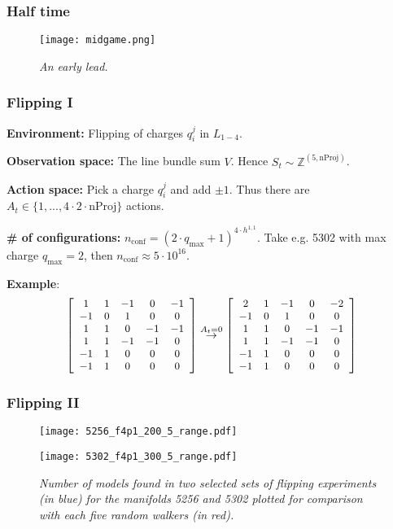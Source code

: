 \documentclass{beamer}
\begin{document}
\begin{frame}
\frametitle{Half time}
\begin{figure}
	\centering
	\texttt{[image: midgame.png]}
	\caption{\it An early lead.}
\end{figure}
\end{frame}

\begin{frame}
\frametitle{Flipping I}
\textbf{Environment:} Flipping of charges $q_i^j$ in $L_{1-4}$.

\textbf{Observation space:} The line bundle sum $V$. Hence $S_t \sim \mathbb{Z}^{(5 , \text{nProj})}$.

\textbf{Action space:} Pick a charge $q_i^j$ and add $\pm 1$. Thus there are $A_t \in \{1, ..., 4 \cdot 2 \cdot \text{nProj} \}$ actions.

\textbf{\# of configurations:} $n_{\text{conf}} = (2 \cdot q_{\text{max}} +1)^{4 \cdot h^{1,1}}$. Take e.g. 5302 with max charge $q_{\text{max}} = 2$, then $n_{\text{conf}} \approx 5 \cdot 10^{16}$.

\textbf{Example}:
\begin{align}
\small
\left[\begin{array}{ccccc}
1& 1& -1& 0& -1\\ 
-1& 0& 1& 0& 0\\ 
1& 1& 0& -1& -1\\ 
1& 1& -1& -1& 0\\ 
-1& 1& 0& 0& 0\\ 
-1& 1& 0& 0& 0
\end{array}\right] \stackrel{A_t = 0}{\rightarrow} \left[\begin{array}{ccccc}
2& 1& -1& 0& -2\\ 
-1& 0& 1& 0& 0\\ 
1& 1& 0& -1& -1\\ 
1& 1& -1& -1& 0\\ 
-1& 1& 0& 0& 0\\ 
-1& 1& 0& 0& 0
\end{array}\right]
\end{align}
\end{frame}

\begin{frame}
\frametitle{Flipping II}
\begin{figure}[ht]
	
	\centering
	\begin{minipage}{0.47\linewidth}
		\texttt{[image: 5256\_f4p1\_200\_5\_range.pdf]}
	\end{minipage}
	\begin{minipage}{0.47\linewidth}
		\texttt{[image: 5302\_f4p1\_300\_5\_range.pdf]}
	\end{minipage}
	
	\caption{\it Number of models found in two selected sets of flipping experiments (in blue) for the manifolds 5256 and 5302 plotted for comparison with each five random walkers (in red).}
	\label{fig: flip}
\end{figure}
\end{frame}
\end{document}
